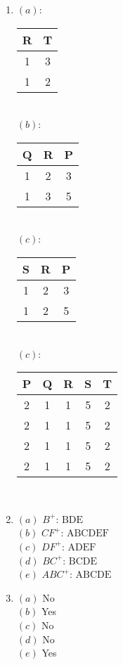 \documentclass{csc_assignment2}
\begin{document}
\begin{description}

\begin{enumerate}
\item $(a)$:
\begin{tabular}{ |c|c| } 
 \hline
 R & T \\
 \hline
 1 & 3 \\ 
 \hline
 1 & 2 \\ 
 \hline
\end{tabular}\\

$(b)$:
\begin{tabular}{ |c|c|c| } 
 \hline
 Q & R & P \\
 \hline
 1 & 2 & 3 \\ 
 \hline
 1 & 3 & 5 \\ 
 \hline
\end{tabular}\\

$(c)$:
\begin{tabular}{ |c|c|c| } 
 \hline
 S & R & P \\
 \hline
 1 & 2 & 3 \\ 
 \hline
 1 & 2 & 5 \\ 
 \hline
\end{tabular}\\

$(c)$:
\begin{tabular}{ |c|c|c|c|c| } 
 \hline
 P & Q & R & S & T \\
 \hline
 2 & 1 & 1 & 5 & 2 \\ 
 \hline
 2 & 1 & 1 & 5 & 2 \\ 
 \hline
 2 & 1 & 1 & 5 & 2 \\ 
 \hline
 2 & 1 & 1 & 5 & 2 \\ 
 \hline
\end{tabular}\\

\item $(a)$ $B^{+}$: $\text{BDE}$ \\
$(b)$ $CF^{+}$: $\text{ABCDEF}$ \\
$(c)$ $DF^{+}$: $\text{ADEF}$ \\
$(d)$ $BC^{+}$: $\text{BCDE}$ \\
$(e)$ $ABC^{+}$: $\text{ABCDE}$ 

\item $(a)$ No\\
$(b)$ Yes\\
$(c)$ No\\
$(d)$ No\\
$(e)$ Yes\\


\end{enumerate}
\end{description}
\end{document}
